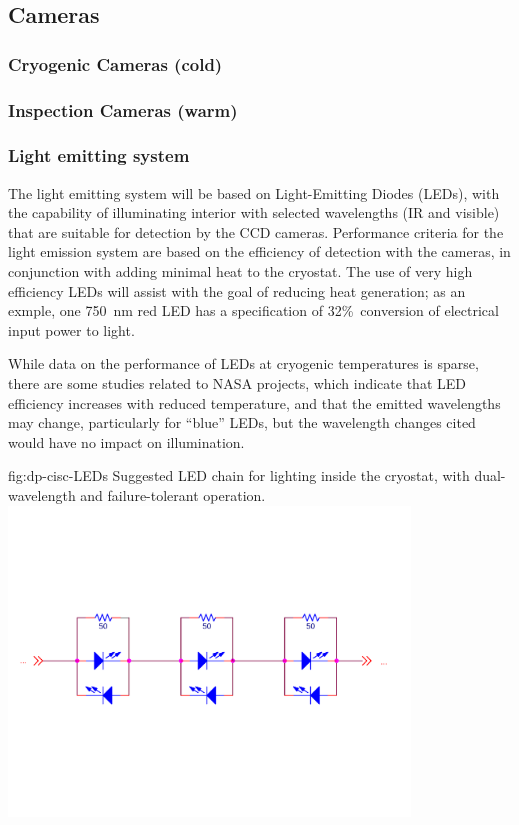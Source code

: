 \subsection{Cameras}
\label{sec:fdsp-slow-cryo-cameras}


\subsubsection{Cryogenic Cameras (cold)}

\subsubsection{Inspection Cameras (warm)}

\subsubsection{Light emitting system}
The light emitting system will be based on Light-Emitting Diodes (LEDs),
with the capability of illuminating interior with selected wavelengths
(IR and visible) that are suitable for detection by the CCD cameras.
Performance criteria for the light emission system are based on the
efficiency of detection with the cameras, in conjunction with adding
minimal heat to the cryostat. The use of very high efficiency LEDs will
assist with the goal of reducing heat generation; as an exmple, one
\SI{750}{nm}
red LED has a specification of 32\%\ conversion of
electrical input power to light. 

While data on the performance of LEDs at cryogenic temperatures is sparse,
there are some studies related to NASA projects\cite{Carron:2017zzz}, which
indicate that LED efficiency increases with reduced temperature,
and that the emitted wavelengths may change, particularly for ``blue'' LEDs,
but the wavelength changes cited would have no impact on illumination.

\begin{dunefigure}{fig:dp-cisc-LEDs}
  {Suggested LED chain for lighting inside the cryostat, with
    dual-wavelength and failure-tolerant operation.}
\includegraphics[width=0.8\textwidth]{../figures/CISC-Lighting.pdf}
\end{dunefigure}


